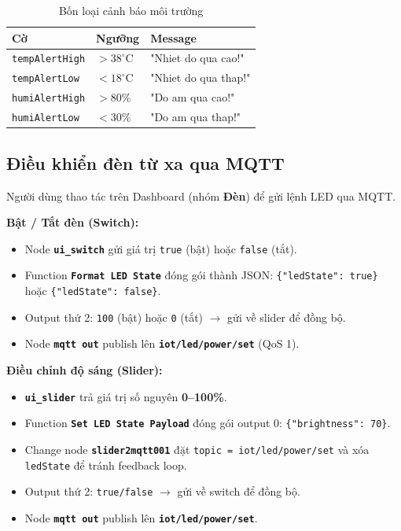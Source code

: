 \documentclass[13pt,a4paper]{article}
\newcommand{\code}[1]{\texttt{#1}}
\begin{document}
\begin{table}[htbp]
    \centering
    \caption{Bốn loại cảnh báo môi trường}
    \label{tbl:alerts}
    \begin{tabular}{|C{3.5cm}|C{3.5cm}|C{5cm}|}
        \hline
        \textbf{Cờ} & \textbf{Ngưỡng} & \textbf{Message} \\
        \hline
        \code{tempAlertHigh} & $> 38^\circ$C & "Nhiet do qua cao!" \\
        \hline
        \code{tempAlertLow} & $< 18^\circ$C & "Nhiet do qua thap!" \\
        \hline
        \code{humiAlertHigh} & $> 80\%$ & "Do am qua cao!" \\
        \hline
        \code{humiAlertLow} & $< 30\%$ & "Do am qua thap!" \\
        \hline
    \end{tabular}
\end{table}

\subsection{Điều khiển đèn từ xa qua MQTT}
\label{sec:dieukhien}

Người dùng thao tác trên Dashboard (nhóm \textbf{Đèn}) để gửi lệnh LED qua MQTT.

\textbf{Bật / Tắt đèn (Switch):}

\begin{itemize}
    \item Node \textbf{\code{ui\_switch}} gửi giá trị \code{true} (bật) hoặc \code{false} (tắt).
    \item Function \textbf{\code{Format LED State}} đóng gói thành JSON: \code{\{"ledState": true\}} hoặc \code{\{"ledState": false\}}.
    \item Output thứ 2: \code{100} (bật) hoặc \code{0} (tắt) $\rightarrow$ gửi về slider để đồng bộ.
    \item Node \textbf{\code{mqtt out}} publish lên \textbf{\code{iot/led/power/set}} (QoS 1).
\end{itemize}

\textbf{Điều chỉnh độ sáng (Slider):}

\begin{itemize}
    \item \textbf{\code{ui\_slider}} trả giá trị số nguyên \textbf{0--100\%}.
    \item Function \textbf{\code{Set LED State Payload}} đóng gói output 0: \code{\{"brightness": 70\}}.
    \item Change node \textbf{\code{slider2mqtt001}} đặt \code{topic = iot/led/power/set} và xóa \code{ledState} để tránh feedback loop.
    \item Output thứ 2: \code{true/false} $\rightarrow$ gửi về switch để đồng bộ.
    \item Node \textbf{\code{mqtt out}} publish lên \textbf{\code{iot/led/power/set}}.
\end{itemize}
\end{document}
